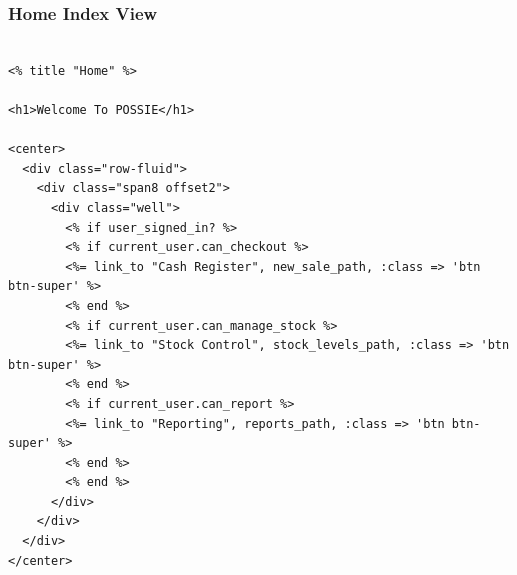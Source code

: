 \documentclass[a4paper]{article}
\begin{document}
\subsubsection{Home Index View}
\begin{verbatim}

<% title "Home" %>

<h1>Welcome To POSSIE</h1>

<center>
  <div class="row-fluid">
    <div class="span8 offset2">
      <div class="well">
        <% if user_signed_in? %>
        <% if current_user.can_checkout %>
        <%= link_to "Cash Register", new_sale_path, :class => 'btn btn-super' %>
        <% end %>
        <% if current_user.can_manage_stock %>
        <%= link_to "Stock Control", stock_levels_path, :class => 'btn btn-super' %>
        <% end %>
        <% if current_user.can_report %>
        <%= link_to "Reporting", reports_path, :class => 'btn btn-super' %>
        <% end %>
        <% end %>
      </div>
    </div>
  </div>
</center>
\end{verbatim}
\end{document}
